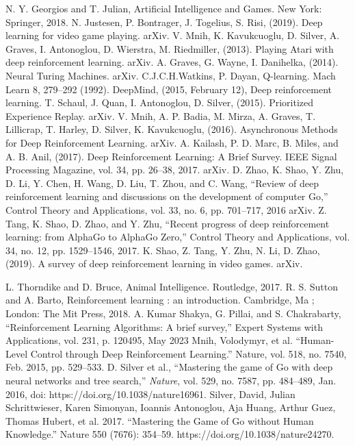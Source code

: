 \documentclass[conference]{IEEEtran}
\begin{document}
\begin{thebibliography}{00}
      N. Y. Georgios and T. Julian, Artificial Intelligence and Games. New York: Springer, 2018.
      N. Justesen, P. Bontrager, J. Togelius, S. Risi, (2019). Deep learning for video game playing. arXiv.
      V. Mnih, K. Kavukcuoglu, D. Silver, A. Graves, I. Antonoglou, D. Wierstra, M. Riedmiller, (2013). Playing Atari with deep reinforcement learning. arXiv.
      A. Graves, G. Wayne, I. Danihelka, (2014). Neural Turing Machines. arXiv.
      C.J.C.H.Watkins, P. Dayan, Q-learning. Mach Learn 8, 279–292 (1992).
      DeepMind, (2015, February 12), Deep reinforcement learning.
      T. Schaul, J. Quan, I. Antonoglou, D. Silver, (2015). Prioritized Experience Replay. arXiv.
      V. Mnih, A. P. Badia, M. Mirza, A. Graves, T. Lillicrap, T. Harley, D. Silver, K. Kavukcuoglu, (2016). Asynchronous Methods for Deep Reinforcement Learning. arXiv.
      A. Kailash, P. D. Marc, B. Miles, and A. B. Anil, (2017). Deep Reinforcement Learning: A Brief Survey. IEEE Signal Processing Magazine, vol. 34, pp. 26–38, 2017. arXiv.
     D. Zhao,  K. Shao, Y. Zhu, D. Li, Y. Chen, H. Wang, D. Liu, T. Zhou, and C. Wang, “Review of deep reinforcement learning and discussions on the development of computer Go,” Control Theory and Applications, vol. 33, no. 6, pp. 701–717, 2016 arXiv.
     Z. Tang, K. Shao, D. Zhao, and Y. Zhu, “Recent progress of deep reinforcement learning: from AlphaGo to AlphaGo Zero,” Control Theory and Applications, vol. 34, no. 12, pp. 1529–1546, 2017.
     K. Shao, Z. Tang, Y. Zhu, N. Li, D. Zhao, (2019). A survey of deep reinforcement learning in video games. arXiv.
    
     L. Thorndike and D. Bruce, Animal Intelligence. Routledge, 2017.
     R. S. Sutton and A. Barto, Reinforcement learning : an introduction. Cambridge, Ma ; London: The Mit Press, 2018.
     A. Kumar Shakya, G. Pillai, and S. Chakrabarty, “Reinforcement Learning Algorithms: A brief survey,” Expert Systems with Applications, vol. 231, p. 120495, May 2023
     Mnih, Volodymyr, et al. “Human-Level Control through Deep Reinforcement Learning.” Nature, vol. 518, no. 7540, Feb. 2015, pp. 529–533.
     D. Silver et al., “Mastering the game of Go with deep neural networks and tree search,” \textit{Nature}, vol. 529, no. 7587, pp. 484–489, Jan. 2016, doi: https://doi.org/10.1038/nature16961.
     Silver, David, Julian Schrittwieser, Karen Simonyan, Ioannis Antonoglou, Aja Huang, Arthur Guez, Thomas Hubert, et al. 2017. “Mastering the Game of Go without Human Knowledge.” Nature 550 (7676): 354–59. https://doi.org/10.1038/nature24270.


\end{thebibliography}
\end{document}
